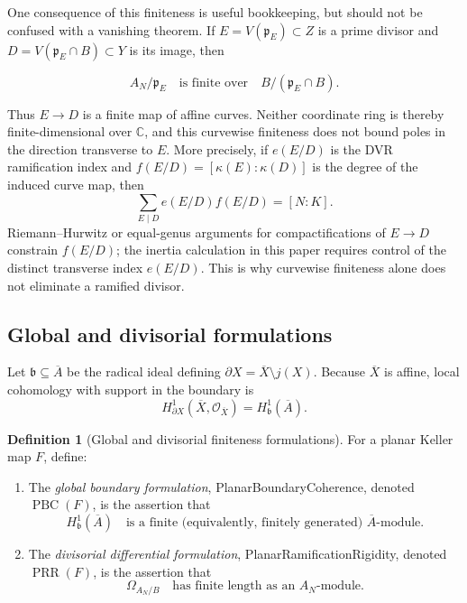 \documentclass[11pt]{article}
\theoremstyle{remark}
\theoremstyle{definition}
\newtheorem{definition}[theorem]{Definition}
\newcommand{\C}{\mathbb C}
\begin{document}
One consequence of this finiteness is useful bookkeeping, but should not be
confused with a vanishing theorem.  If \(E=V(\mathfrak p_E)\subset Z\) is a
prime divisor and \(D=V(\mathfrak p_E\cap B)\subset Y\) is its image, then

\[
  A_N/\mathfrak p_E
  \quad\text{is finite over}\quad
  B/(\mathfrak p_E\cap B).
\]

Thus \(E\to D\) is a finite map of affine curves.  Neither coordinate ring
is thereby finite-dimensional over \(\C\), and this curvewise finiteness does
not bound poles in the direction transverse to \(E\).  More precisely, if
\(e(E/D)\) is the DVR ramification index and
\(f(E/D)=[\kappa(E):\kappa(D)]\) is the degree of the induced curve map,
then
\[
  \sum_{E\mid D}e(E/D)f(E/D)=[N:K].
\]
Riemann--Hurwitz or equal-genus arguments for compactifications of
\(E\to D\) constrain \(f(E/D)\); the inertia calculation in this paper
requires control of the distinct transverse index \(e(E/D)\).  This is why
curvewise finiteness alone does not eliminate a ramified divisor.

\subsection{Global and divisorial formulations}
\label{sec:two-planar-finiteness-targets}

Let \(\mathfrak b\subseteq\overline A\) be the radical ideal defining
\(\partial X=\overline X\setminus j(X)\).  Because \(\overline X\) is
affine, local cohomology with support in the boundary is
\[
  H^1_{\partial X}(\overline X,\mathcal O_{\overline X})
  =H^1_{\mathfrak b}(\overline A).
\]

\begin{definition}[Global and divisorial finiteness formulations]
\label{def:two-planar-finiteness-targets}
For a planar Keller map \(F\), define:
\begin{enumerate}
  \item The \emph{global boundary formulation}, PlanarBoundaryCoherence,
  denoted
  \(\operatorname{PBC}(F)\), is the assertion that
  \[
    H^1_{\mathfrak b}(\overline A)
    \quad\text{is a finite (equivalently, finitely generated)
    \(\overline A\)-module}.
  \]
  \item The \emph{divisorial differential formulation},
  PlanarRamificationRigidity, denoted
  \(\operatorname{PRR}(F)\), is the assertion that
  \[
    \Omega_{A_N/B}
    \quad\text{has finite length as an \(A_N\)-module}.
  \]
\end{enumerate}
\end{definition}
\end{document}
